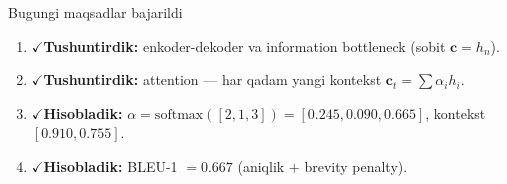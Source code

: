 \documentclass[aspectratio=169,11pt]{beamer}
\newcommand{\bajarildi}{{\color{deepgreen}\large$\checkmark$}\;}
\begin{document}
\begin{frame}{Bugungi maqsadlar bajarildi}
  \begin{enumerate}\setlength\itemsep{7pt}
    \item \bajarildi \textbf{Tushuntirdik:} enkoder-dekoder va information bottleneck
          (sobit $\mathbf{c}=h_n$).
    \item \bajarildi \textbf{Tushuntirdik:} attention --- har qadam yangi kontekst
          $\mathbf{c}_t=\sum\alpha_i h_i$.
    \item \bajarildi \textbf{Hisobladik:} $\alpha=\mathrm{softmax}([2,1,3])=[0.245,0.090,0.665]$,
          kontekst $[0.910,0.755]$.
    \item \bajarildi \textbf{Hisobladik:} BLEU-1 $=0.667$ (aniqlik $+$ brevity penalty).
  \end{enumerate}
\end{frame}
\end{document}
